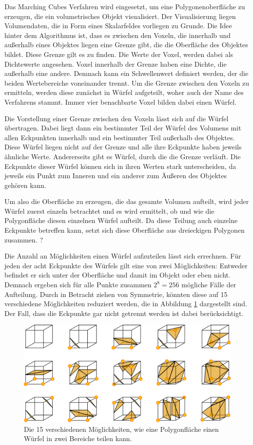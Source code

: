 Das Marching Cubes Verfahren wird eingesetzt, um eine Polygonenoberfläche zu erzeugen, die ein volumetrisches Objekt visualisiert. 
Der Visualisierung liegen Volumendaten, die in Form eines Skalarfeldes vorliegen zu Grunde.
Die Idee hinter dem Algorithmus ist, dass es zwischen den Voxeln, die innerhalb und außerhalb eines Objektes liegen eine Grenze gibt, die die Oberfläche des Objektes bildet. Diese Grenze gilt es zu finden. 
Die Werte der Voxel, werden dabei als Dichtewerte angesehen. Voxel innerhalb der Grenze haben eine Dichte, die außerhalb eine andere. Demnach kann ein Schwellenwert definiert werden, der die beiden Wertebereiche voneinander trennt.
Um die Grenze zwischen den Voxeln zu ermitteln, werden diese zunächst in Würfel aufgeteilt, woher auch der Name des Verfahrens stammt. Immer vier benachbarte Voxel bilden dabei einen Würfel.  

Die Vorstellung einer Grenze zwischen den Voxeln lässt sich auf die Würfel übertragen. Dabei liegt dann ein bestimmter Teil der Würfel des Volumens mit allen Eckpunkten innerhalb und ein bestimmter Teil außerhalb des Objektes. Diese Würfel liegen nicht auf der Grenze und alle ihre Eckpunkte haben jeweils ähnliche Werte. Andererseits gibt es Würfel, durch die die Grenze verläuft. Die Eckpunkte dieser Würfel können sich in ihren Werten stark unterscheiden, da jeweils ein Punkt zum Inneren und ein anderer zum Äußeren des Objektes gehören kann. 

Um also die Oberfläche zu erzeugen, die das gesamte Volumen aufteilt, wird jeder Würfel zuerst einzeln betrachtet und es wird ermittelt, ob und wie die Polygonfläche diesen einzelnen Würfel aufteilt.  Da diese Teilung auch einzelne Eckpunkte betreffen kann, setzt sich diese Oberfläche aus dreieckigen Polygonen zusammen. ?

Die Anzahl an Möglichkeiten einen Würfel aufzuteilen lässt sich errechnen. Für jeden der acht Eckpunkte des Würfels gilt eine von zwei Möglichkeiten: Entweder befindet er sich unter der Oberfläche und damit im Objekt oder eben nicht. Demnach ergeben sich für alle Punkte zusammen $2^8=256$ mögliche Fälle der Aufteilung. \citet{aigner07} Durch in Betracht ziehen von Symmetrie, könnten diese auf 15 verschiedene Möglichkeiten reduziert werden, die in Abbildung \ref{img:marchingCubes} dargestellt sind. Der Fall, dass die Eckpunkte gar nicht getrennt werden ist dabei berücksichtigt. 

\begin{figure}
	\centering
	\includegraphics[width=0.7\linewidth]{images/MarchingCubes.png}
	\caption{Die 15 verschiedenen Möglichkeiten, wie eine Polygonfläche einen Würfel in zwei Bereiche teilen kann.}
	\label{img:marchingCubes}
\end{figure}

